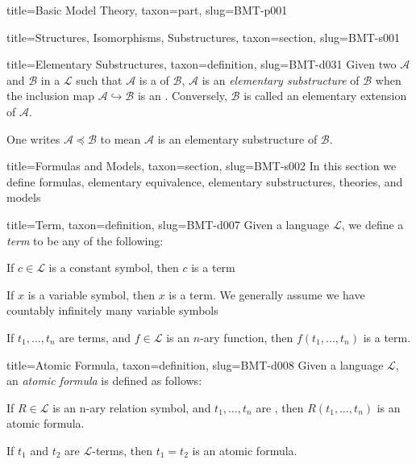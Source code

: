\documentclass[a4paper]{article}
\begin{document}
\begin{tree}{title={Basic Model Theory}, taxon={part}, slug={BMT-p001}}
\begin{tree}{title={Structures, Isomorphisms, Substructures}, taxon={section}, slug={BMT-s001}}
\begin{tree}{title={Elementary Substructures}, taxon={definition}, slug={BMT-d031}}
    Given two  \(\mathcal {A}\) and \(\mathcal {B}\) in a  \(\mathcal {L}\)
    such that \(\mathcal  A\) is a  of \(\mathcal  B\),
    \(\mathcal  A\) is an \emph{elementary substructure} of \(\mathcal  B\) when the inclusion map \(\mathcal  A \hookrightarrow \mathcal  B\)
    is an .
    Conversely, \(\mathcal  B\) is called an elementary extension of \(\mathcal  A\).
\par{
    One writes \(\mathcal  A \preceq \mathcal  B\) to mean \(\mathcal  A\) is an elementary substructure of \(\mathcal  B\).
}
\end{tree}

\end{tree}


  
  
\begin{tree}{title={Formulas and Models}, taxon={section}, slug={BMT-s002}}
In this section we define formulas, elementary equivalence, elementary substructures, theories, and models
\begin{tree}{title={Term}, taxon={definition}, slug={BMT-d007}}
Given a language \(\mathcal {L}\), we define a \emph{term} to be any of the following:\par{If \(c \in   \mathcal {L}\) is a constant symbol, then \(c\) is a term}\par{If \(x\) is a variable symbol, then \(x\) is a term. We generally assume we have countably infinitely many variable symbols}\par{If \(t_1,..., t_n\) are terms, and \(f \in   \mathcal {L}\) is an \(n\)-ary function, then \(f(t_1,..., t_n)\) is a term.}
\end{tree}

\begin{tree}{title={Atomic Formula}, taxon={definition}, slug={BMT-d008}}
Given a language \(\mathcal {L}\), an \emph{atomic formula} is defined as follows:\par{If \(R \in   \mathcal {L}\) is an n-ary relation symbol, and \(t_1, \dots , t_n\) are , then \(R(t_1, \dots , t_n)\) is an atomic formula.}\par{If \(t_1\) and \(t_2\) are \(\mathcal {L}\)-terms, then \(t_1 = t_2\) is an atomic formula. }
\end{tree}


\end{tree}
\end{tree}
\end{document}
